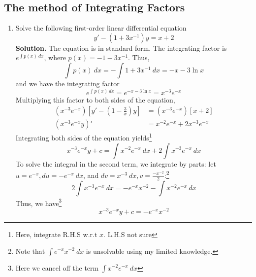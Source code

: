 \documentclass{article}
\begin{document}
\subsection{The method of Integrating Factors}
\begin{enumerate}
    \item Solve the following first-order linear differential equation
    \begin{equation}
        y'-(1+3x^{-1})y=x+2
    \end{equation}
    \textbf{Solution.} The equation is in standard form. The integrating factor is $e^{\int p(x)~dx}$, where $p(x)=-1-3x^{-1}$. Thus,
    \begin{equation*}
        \int p(x)~dx=-\int 1+3x^{-1}~dx=-x-3\ln x
    \end{equation*}
    and we have the integrating factor
    \begin{equation*}
        e^{\int p(x)~dx}=e^{-x-3\ln x}=x^{-3}e^{-x}
    \end{equation*}
    Multiplying this factor to both sides of the equation,
    \begin{align*}
        (x^{-3}e^{-x})[y'-(1-\frac{3}{x})y]&=(x^{-3}e^{-x})[x+2] \\
        (x^{-3}e^{-x}y)'&=x^{-2}e^{-x}+2x^{-3}e^{-x}
    \end{align*}
    Integrating both sides of the equation yields\footnote{Here, integrate R.H.S w.r.t $x$. L.H.S not sure}
    \begin{equation*}
        x^{-3}e^{-x}y+c=\int x^{-2}e^{-x}~dx+2\int x^{-3}e^{-x}~dx
    \end{equation*}
    To solve the integral in the second term, we integrate by parts: let $u=e^{-x},du=-e^{-x}~dx$, and $dv=x^{-3}~dx, v=\frac{-x^{-2}}{2}$:\footnote{Note that $\int e^{-x}x^{-2}~dx$ is unsolvable using my limited knowledge.} 
    \begin{equation*}
        2\int x^{-3}e^{-x}~dx=-e^{-x}x^{-2}-\int x^{-2}e^{-x}~dx
    \end{equation*}
    Thus, we have\footnote{Here we cancel off the term $\int x^{-2}e^{-x}~dx$}
    \begin{equation*}
        x^{-3}e^{-x}y+c=-e^{-x}x^{-2}
    \end{equation*}
\end{enumerate}
\end{document}
